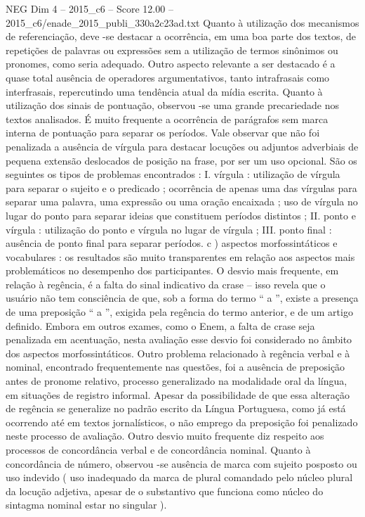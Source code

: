 \begin{textsample}{NEG Dim 4 – 2015\_c6 – Score 12.00 – 2015\_c6/enade\_2015\_publi\_330a2c23ad.txt}
Quanto à utilização dos mecanismos de referenciação, deve -se destacar a ocorrência, em uma boa parte dos textos, de repetições de palavras ou expressões sem a utilização de termos sinônimos ou pronomes, como seria adequado.
Outro aspecto relevante a ser destacado é a quase total ausência de operadores argumentativos, tanto intrafrasais como interfrasais, repercutindo uma tendência atual da mídia escrita.
Quanto à utilização dos sinais de pontuação, observou -se uma grande precariedade nos textos analisados.
É muito frequente a ocorrência de parágrafos sem marca interna de pontuação para separar os períodos.
Vale observar que não foi penalizada a ausência de vírgula para destacar locuções ou adjuntos adverbiais de pequena extensão deslocados de posição na frase, por ser um uso opcional.
São os seguintes os tipos de problemas encontrados : I. vírgula : utilização de vírgula para separar o sujeito e o predicado ; ocorrência de apenas uma das vírgulas para separar uma palavra, uma expressão ou uma oração encaixada ; uso de vírgula no lugar do ponto para separar ideias que constituem períodos distintos ; II. ponto e vírgula : utilização do ponto e vírgula no lugar de vírgula ; III. ponto final : ausência de ponto final para separar períodos. c ) aspectos morfossintáticos e vocabulares : os resultados são muito transparentes em relação aos aspectos mais problemáticos no desempenho dos participantes.
O desvio mais frequente, em relação à regência, é a falta do sinal indicativo da crase – isso revela que o usuário não tem consciência de que, sob a forma do termo “ a ”, existe a presença de uma preposição “ a ”, exigida pela regência do termo anterior, e de um artigo definido.
Embora em outros exames, como o Enem, a falta de crase seja penalizada em acentuação, nesta avaliação esse desvio foi considerado no âmbito dos aspectos morfossintáticos.
Outro problema relacionado à regência verbal e à nominal, encontrado frequentemente nas questões, foi a ausência de preposição antes de pronome relativo, processo generalizado na modalidade oral da língua, em situações de registro informal.
Apesar da possibilidade de que essa alteração de regência se generalize no padrão escrito da Língua Portuguesa, como já está ocorrendo até em textos jornalísticos, o não emprego da preposição foi penalizado neste processo de avaliação.
Outro desvio muito frequente diz respeito aos processos de concordância verbal e de concordância nominal.
Quanto à concordância de número, observou -se ausência de marca com sujeito posposto ou uso indevido ( uso inadequado da marca de plural comandado pelo núcleo plural da locução adjetiva, apesar de o substantivo que funciona como núcleo do sintagma nominal estar no singular ).

\end{textsample}
